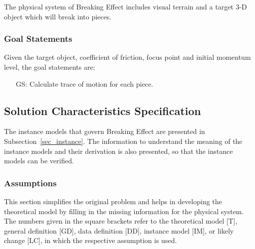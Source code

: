 \documentclass[12pt]{article}
\newcounter{goalnum} %
\newcommand{\progname}{Breaking Effect} %
\begin{document}
	The physical system of \progname{} includes visual terrain  and a target 3-D object which will break into pieces.
	
	
	\subsubsection{Goal Statements}
	
	\noindent Given the target object, coefficient of friction, focus point and initial momentum level, the goal statements are:
	
	\begin{itemize}
		
		\item[GS\refstepcounter{goalnum}\thegoalnum \label{G_motion}:] Calculate trace of motion for each piece.
		
	\end{itemize}
	
	\subsection{Solution Characteristics Specification}
	
	The instance models that govern \progname{} are presented in
	Subsection~\ref{sec_instance}.  The information to understand the meaning of the
	instance models and their derivation is also presented, so that the instance
	models can be verified.
	
	\subsubsection{Assumptions}
	
	This section simplifies the original problem and helps in developing the
	theoretical model by filling in the missing information for the physical
	system. The numbers given in the square brackets refer to the theoretical model
	[T], general definition [GD], data definition [DD], instance model [IM], or
	likely change [LC], in which the respective assumption is used.
	
\end{document}

